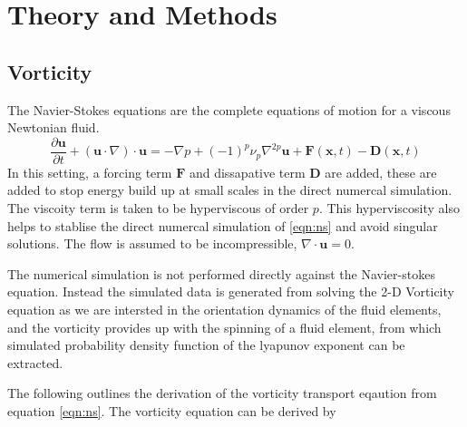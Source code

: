 \chapter{Theory and Methods} \label{ch:theory}

\section{Vorticity} \label{sec:theory-v}
The Navier-Stokes equations are the complete equations of motion for a viscous Newtonian fluid. 
\begin{equation}
\label{eqn:ns}
\frac{\partial \mathbf{u}}{\partial t} + (\mathbf{u} \cdot \nabla)\cdot \mathbf{u} = - \nabla p + (-1)^p \nu_p \nabla^{2 p} \mathbf{u} + \mathbf{F}(\mathbf{x},t) - \mathbf{D}(\mathbf{x},t) 
\end{equation}
In this setting, a forcing term $\mathbf{F}$ and dissapative term $\mathbf{D}$ are added, these are added to stop energy build up at small scales in the direct numercal simulation. 
The viscoity term is taken to be hyperviscous of order $p$. This hyperviscosity also helps to stablise the direct numercal simulation of \ref{eqn:ns} and avoid singular solutions.
The flow is assumed to be incompressible, $\nabla \cdot \mathbf{u} = 0$.

The numerical simulation is not performed directly against the Navier-stokes equation. Instead the simulated data is generated from solving the 2-D Vorticity equation as we are intersted in the orientation dynamics of the fluid elements, and the 
vorticity provides up with the spinning of a fluid element, from which simulated probability density function of the lyapunov exponent can be extracted.

The following outlines the derivation of the vorticity transport eqaution from equation \ref{eqn:ns}. The vorticity equation can be derived by 

